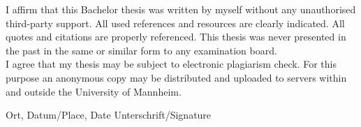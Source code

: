 \documentclass[a4paper,12pt]{scrartcl} %
\begin{document}
\vspace{1cm}

I affirm that this Bachelor thesis was written by myself without any unauthorised third-party
support. All used references and resources are clearly indicated. All quotes and citations are
properly referenced. This thesis was never presented in the past in the same or similar form to
any examination board.\\
I agree that my thesis may be subject to electronic plagiarism check. For this purpose an
anonymous copy may be distributed and uploaded to servers within and outside the University
of Mannheim.

\vspace{3cm}
\makebox[\textwidth]{\hrulefill \hspace{3cm} \hrulefill}

Ort, Datum/Place, Date \hfill Unterschrift/Signature
\end{document}
